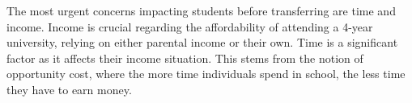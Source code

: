 \documentclass{article}
\begin{document}

The most urgent concerns impacting students before transferring are time and income. Income is crucial regarding the affordability of attending a 4-year university, relying on either parental income or their own. Time is a significant factor as it affects their income situation. This stems from the notion of opportunity cost, where the more time individuals spend in school, the less time they have to earn money. 




\medskip
\end{document}
